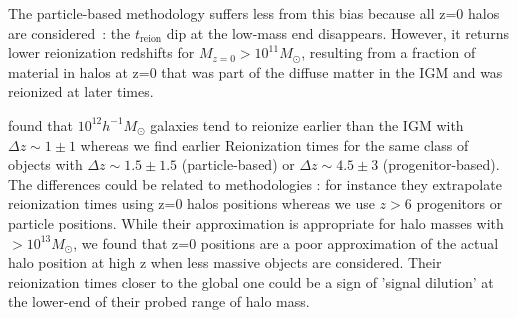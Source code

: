\documentclass[twocolumn]{aastex61}
\begin{document}
The particle-based methodology suffers less from this bias because all z=0 halos are considered~: the $t_\mathrm{reion}$ dip at the low-mass end disappears. However, it returns lower reionization redshifts for $M_{z=0}>10^{11} M_\odot$, resulting from  a fraction of material in halos at z=0 that was part of the diffuse matter in the IGM and was reionized at later times.

\citet{LI14} found  that $10^{12} h^{-1} M_\odot$ galaxies tend to reionize earlier than the IGM with $\Delta z\sim 1\pm1$ whereas we find earlier Reionization times for the same class of objects with $\Delta z\sim 1.5\pm 1.5$ (particle-based) or $\Delta z\sim 4.5\pm 3$ (progenitor-based). The differences could be related to methodologies : for instance they extrapolate reionization times using z=0 halos positions whereas we use $z>6$ progenitors or particle positions. While their approximation is appropriate for halo masses with $>10^{13} M_\odot$, we found that z=0 positions are a poor approximation of the actual halo position at high z when less massive objects are considered. Their reionization times closer to the global one could be a sign of 'signal dilution' at the lower-end of their probed range of halo mass. 
\end{document}
